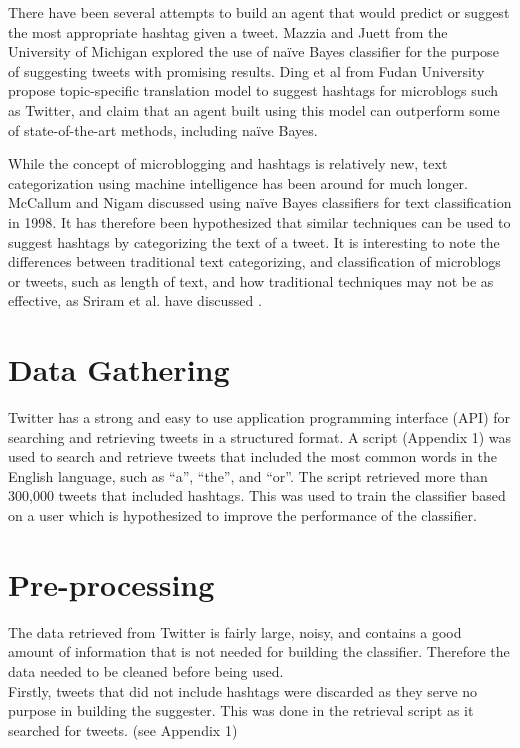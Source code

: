 \documentclass[conference]{IEEEtran}
\begin{document}
There have been several attempts to build an agent that would predict or suggest the most appropriate hashtag given a tweet. Mazzia and Juett from the University of Michigan \cite{mazzia} explored the use of naïve Bayes classifier for the purpose of suggesting tweets with promising results. Ding et al from Fudan University \cite{huang} propose topic-specific translation model to suggest hashtags for microblogs such as Twitter, and claim that an agent built using this model can outperform some of state-of-the-art methods, including naïve Bayes.

While the concept of microblogging and hashtags is relatively new, text categorization using machine intelligence has been around for much longer. McCallum and Nigam \cite{mccallum} discussed using naïve Bayes classifiers for text classification in 1998. It has therefore been hypothesized that similar techniques can be used to suggest hashtags by categorizing the text of a tweet. It is interesting to note the differences between traditional text categorizing, and classification of microblogs or tweets, such as length of text, and how traditional techniques may not be as effective, as Sriram et al. have discussed \cite{sriram}.

\section{Data Gathering}
Twitter has a strong and easy to use application programming interface (API) for searching and retrieving tweets in a structured format. A script (Appendix 1) was used to search and retrieve tweets that included the most common words in the English language, such as ``a'', ``the'', and ``or''. The script retrieved more than 300,000 tweets that included hashtags. This was used to train the classifier based on a user which is hypothesized to improve the performance of the classifier.


\section{Pre-processing}
The data retrieved from Twitter is fairly large, noisy, and contains a good amount of information that is not needed for building the classifier. Therefore the data needed to be cleaned before being used. \\

Firstly, tweets that did not include hashtags were discarded as they serve no purpose in building the suggester. This was done in the retrieval script as it searched for tweets. (see Appendix 1) \\
\end{document}
